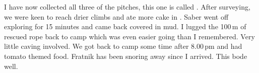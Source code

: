 I have now collected all three of the  pitches, this one is called . After surveying, we were keen to reach drier climbs and ate more cake in . Saber went off exploring for 15 minutes and came back covered in mud. I lugged the 100\,m of rescued rope back to camp which was even easier going than I remembered. Very little caving involved. We got back to camp some time after 8.00\,pm and had tomato themed food. Fratnik has been snoring away since I arrived. This bode well.



